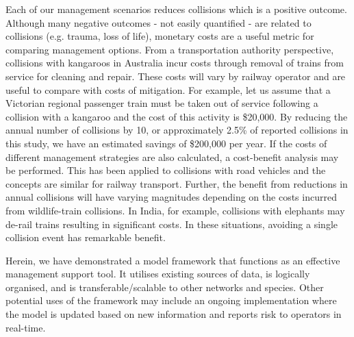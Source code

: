 Each of our management scenarios reduces collisions which is a positive outcome.  Although many negative outcomes - not easily quantified - are related to collisions (e.g. trauma, loss of life), monetary costs are a useful metric for comparing management options. From a transportation authority perspective, collisions with kangaroos in Australia incur costs through removal of trains from service for cleaning and repair.  These costs will vary by railway operator and are useful to compare with costs of mitigation.  For example, let us assume that a Victorian regional passenger train must be taken out of service following a collision with a kangaroo and the cost of this activity is \$20,000.  By reducing the annual number of collisions by 10, or approximately 2.5\% of reported collisions in this study, we have an estimated savings of \$200,000 per year.  If the costs of different management strategies are also calculated, a cost-benefit analysis may be performed.  This has been applied to collisions with road vehicles \citep{huij09} and the concepts are similar for railway transport. Further, the benefit from reductions in annual collisions will have varying magnitudes depending on the costs incurred from wildlife-train collisions. In India, for example, collisions with elephants may de-rail trains \citep{dors15} resulting in significant costs. In these situations, avoiding a single collision event has remarkable benefit.

Herein, we have demonstrated a model framework that functions as an effective management support tool. It utilises existing sources of data, is logically organised, and is transferable/scalable to other networks and species. Other potential uses of the framework may include an ongoing implementation where the model is updated based on new information and reports risk to operators in real-time.